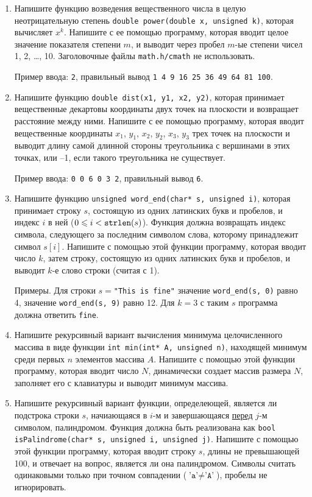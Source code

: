 \documentclass{article}
\newcommand{\textex}[1]{\texttt{\color{ForestGreen}#1}}
\begin{document}
\sloppy
\begin{enumerate}
\item
Напишите функцию возведения вещественного числа в целую неотрицательную степень \texttt{double power(double x, unsigned k)}, которая вычисляет $x^k$. Напишите с ее помощью программу, которая вводит целое значение показателя степени $m$, и выводит через пробел $m$-ые степени чисел 1, 2, \ldots, 10. Заголовочные файлы \texttt{math.h/cmath} не использовать.

Пример ввода: \textex{2}, правильный вывод \textex{1 4 9 16 25 36 49 64 81 100}.

\item
Напишите функцию \texttt{double dist(x1, y1, x2, y2)}, которая принимает вещественные декартовы координаты двух точек на плоскости и возвращает расстояние между ними. Напишите с ее помощью программу, которая вводит вещественные координаты $x_1$, $y_1$, $x_2$, $y_2$, $x_3$, $y_3$ трех точек на плоскости и выводит длину самой длинной стороны треугольника с вершинами в этих точках, или –1, если такого треугольника не существует.

Пример ввода: \textex{0 0 6 0 3 2}, правильный вывод \textex{6}.

\item
Напишите функцию \texttt{unsigned word\_end(char* s, unsigned i)}, 
которая принимает строку $s$, состоящую из одних латинских букв и пробелов, и индекс $i$ в ней ($0 \leqslant i<\mbox{\texttt{strlen}}(s)$). Функция должна возвращать индекс символа, следующего за последним символом слова, которому принадлежит символ $s[i]$. Напишите с помощью этой функции программу, которая вводит число $k$, затем строку, состоящую из одних латинских букв и пробелов, и выводит $k$-е слово строки (считая с 1).

Примеры. Для строки $s={}$\verb!"!\texttt{This is fine"}
значение \texttt{word\_end(s, 0)}  равно 4,  значение \texttt{word\_end(s, 9)} равно 12.
Для $k=3$ с таким $s$ программа должна ответить \textex{fine}.

\item
Напишите рекурсивный вариант вычисления минимума целочисленного массива в виде функции \texttt{int min(int* A, unsigned n)}, находящей минимум среди первых $n$ элементов массива $A$. Напишите с помощью этой функции программу, которая вводит число $N$, динамически создает массив размера $N$, заполняет его с клавиатуры и выводит минимум массива.

\item
Напишите рекурсивный вариант функции, определеющей, является ли подстрока строки $s$, начиающаяся в $i$-м и завершающаяся \underline{перед} $j$-м символом, палиндромом. Функция должна быть реализована как \texttt{bool isPalindrome(char* s, unsigned i, unsigned j)}. Напишите с помощью этой функции программу, которая вводит строку $s$, длины не превышающей 100, и отвечает на вопрос, является ли она палиндромом. Символы считать одинаковыми только при точном совпадении ($\texttt{'a'}\ne\texttt{'A'}$), пробелы не игнорировать.

\end{enumerate}
\end{document}
